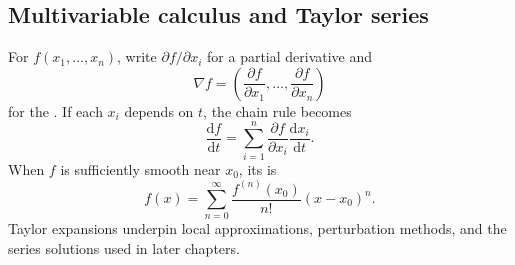 \subsection{Multivariable calculus and Taylor series}

For $f(x_1,\ldots,x_n)$, write $\partial f/\partial x_i$ for a partial derivative and
\begin{equation}
\nabla f=\left(\frac{\partial f}{\partial x_1},\ldots,\frac{\partial f}{\partial x_n}\right)
\end{equation}
for the . If each $x_i$ depends on $t$, the chain rule becomes
\begin{equation}
\frac{\mathrm{d}f}{\mathrm{d}t}=\sum_{i=1}^n\frac{\partial f}{\partial x_i}\frac{\mathrm{d}x_i}{\mathrm{d}t}.
\end{equation}
When $f$ is sufficiently smooth near $x_0$, its  is
\begin{equation}
f(x)=\sum_{n=0}^{\infty}\frac{f^{(n)}(x_0)}{n!}(x-x_0)^n.
\end{equation}
Taylor expansions underpin local approximations, perturbation methods, and the series solutions used in later chapters.
